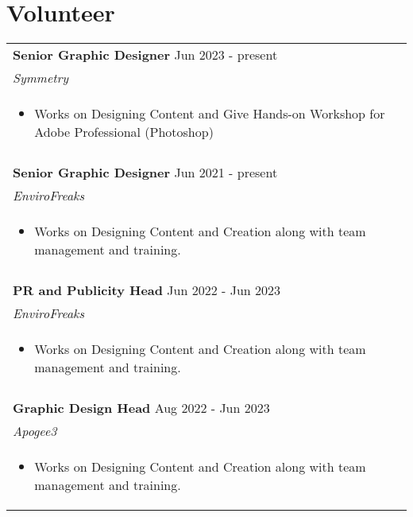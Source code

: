 \documentclass[a4paper,16pt]{article}
\begin{document}
\section{Volunteer}
\begin{tabularx}{\linewidth}{ @{}l r@{} }
\textbf{Senior Graphic Designer} \hfill Jun 2023 - present \\
\textit{Symmetry}
\\
\begin{itemize}
    \item Works on Designing Content and Give Hands-on Workshop for Adobe Professional (Photoshop)
\end{itemize}\\
\\
\textbf{Senior Graphic Designer} \hfill Jun 2021 - present \\
\textit{EnviroFreaks}
\\
\begin{itemize}
    \item Works on Designing Content and Creation along with team management and training.
\end{itemize}\\\\
\textbf{PR and Publicity Head} \hfill Jun 2022 - Jun 2023 \\
\textit{EnviroFreaks}
\\
\begin{itemize}
    \item Works on Designing Content and Creation along with team management and training.
\end{itemize}\\\\
\textbf{Graphic Design Head} \hfill Aug 2022 - Jun 2023  \\
\textit{Apogee3}\\
\begin{itemize}
    \item Works on Designing Content and Creation along with team management and training.
\end{itemize}
\end{tabularx}
\end{document}
